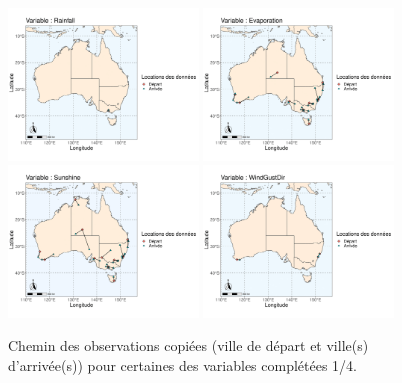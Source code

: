 \documentclass{article}
\begin{document}
\begin{figure}[htp]
    \centering
    \includegraphics[width=0.45\textwidth]{Images/Australia_map_segments_complete/Australia_map_segments_complete-01.png}
    \includegraphics[width=0.45\textwidth]{Images/Australia_map_segments_complete/Australia_map_segments_complete-02.png}
    \includegraphics[width=0.45\textwidth]{Images/Australia_map_segments_complete/Australia_map_segments_complete-03.png}
    \includegraphics[width=0.45\textwidth]{Images/Australia_map_segments_complete/Australia_map_segments_complete-04.png}
    \caption{Chemin des observations copiées (ville de départ et ville(s) d'arrivée(s)) pour certaines des variables complétées 1/4.}
    \label{fig:path_data1}
\end{figure}
\end{document}
